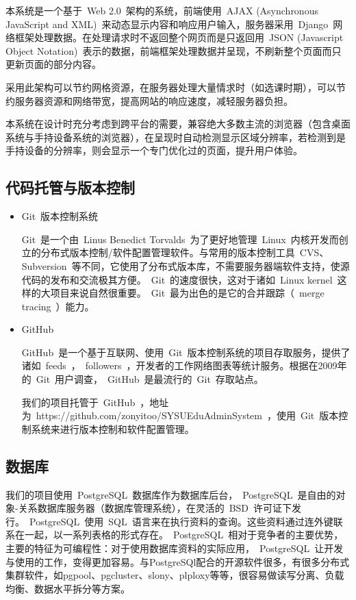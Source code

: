 本系统是一个基于~Web 2.0~架构的系统，前端使用~AJAX (Asynchronous JavaScript and XML)~来动态显示内容和响应用户输入，服务器采用~Django~网络框架处理数据。在处理请求时不返回整个网页而是只返回用~JSON (Javascript Object Notation)~表示的数据，前端框架处理数据并呈现，不刷新整个页面而只更新页面的部分内容。

采用此架构可以节约网格资源，在服务器处理大量情求时（如选课时期），可以节约服务器资源和网络带宽，提高网站的响应速度，减轻服务器负担。

本系统在设计时充分考虑到跨平台的需要，兼容绝大多数主流的浏览器（包含桌面系统与手持设备系统的浏览器），在呈现时自动检测显示区域分辨率，若检测到是手持设备的分辨率，则会显示一个专门优化过的页面，提升用户体验。


\subsection{代码托管与版本控制}
\begin{itemize}
  \item Git~版本控制系统
  
  \CJKindent Git~是一个由~Linus Benedict Torvalds~为了更好地管理~Linux~内核开发而创立的分布式版本控制/软件配置管理软件。与常用的版本控制工具~CVS、Subversion~等不同，它使用了分布式版本库，不需要服务器端软件支持，使源代码的发布和交流极其方便。~Git~的速度很快，这对于诸如~Linux kernel~这样的大项目来说自然很重要。~Git~最为出色的是它的合并跟踪（~merge tracing~）能力。
  
  \item GitHub
  
  \CJKindent GitHub~是一个基于互联网、使用~Git~版本控制系统的项目存取服务，提供了诸如~feeds~，~followers~，开发者的工作网络图表等统计服务。根据在2009年的~Git~用户调查，~GitHub~是最流行的~Git~存取站点。
  
  \CJKindent 我们的项目托管于~GitHub~，地址为~https://github.com/zonyitoo/SYSUEduAdminSystem~，使用~Git~版本控制系统来进行版本控制和软件配置管理。
\end{itemize}

\subsection{数据库}
我们的项目使用~PostgreSQL~数据库作为数据库后台，~PostgreSQL~是自由的对象-关系数据库服务器（数据库管理系统），在灵活的~BSD~许可证下发行。~PostgreSQL~使用~SQL~语言来在执行资料的查询。这些资料通过连外键联系在一起，以一系列表格的形式存在。~PostgreSQL~相对于竞争者的主要优势，主要的特征为可编程性：对于使用数据库资料的实际应用，~PostgreSQL~让开发与使用的工作，变得更加容易。与PostgreSQl配合的开源软件很多，有很多分布式集群软件，如pgpool、pgcluster、slony、plploxy等等，很容易做读写分离、负载均衡、数据水平拆分等方案。

